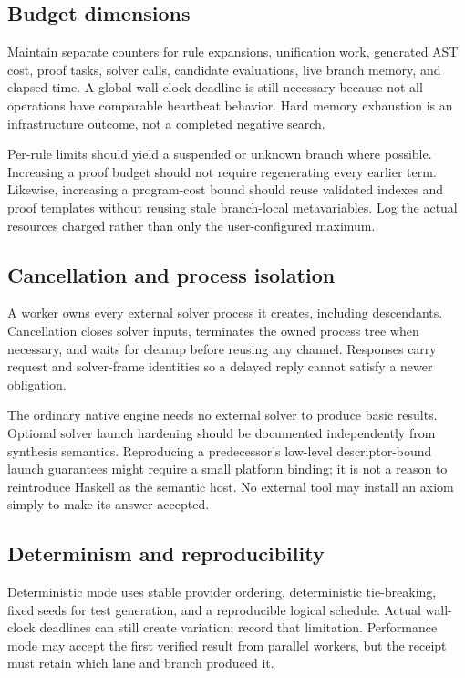 \subsection{Budget dimensions}

Maintain separate counters for rule expansions, unification work, generated
AST cost, proof tasks, solver calls, candidate evaluations, live branch memory,
and elapsed time. A global wall-clock deadline is still necessary because not
all operations have comparable heartbeat behavior. Hard memory exhaustion is
an infrastructure outcome, not a completed negative search.

Per-rule limits should yield a suspended or unknown branch where possible.
Increasing a proof budget should not require regenerating every earlier term.
Likewise, increasing a program-cost bound should reuse validated indexes and
proof templates without reusing stale branch-local metavariables. Log the
actual resources charged rather than only the user-configured maximum.

\subsection{Cancellation and process isolation}

A worker owns every external solver process it creates, including descendants.
Cancellation closes solver inputs, terminates the owned process tree when
necessary, and waits for cleanup before reusing any channel. Responses carry
request and solver-frame identities so a delayed reply cannot satisfy a newer
obligation.

The ordinary native engine needs no external solver to produce basic results.
Optional solver launch hardening should be documented independently from
synthesis semantics. Reproducing a predecessor's low-level descriptor-bound
launch guarantees might require a small platform binding; it is not a reason
to reintroduce Haskell as the semantic host. No external tool may install an
axiom simply to make its answer accepted.

\subsection{Determinism and reproducibility}

Deterministic mode uses stable provider ordering, deterministic tie-breaking,
fixed seeds for test generation, and a reproducible logical schedule. Actual
wall-clock deadlines can still create variation; record that limitation.
Performance mode may accept the first verified result from parallel workers,
but the receipt must retain which lane and branch produced it.

